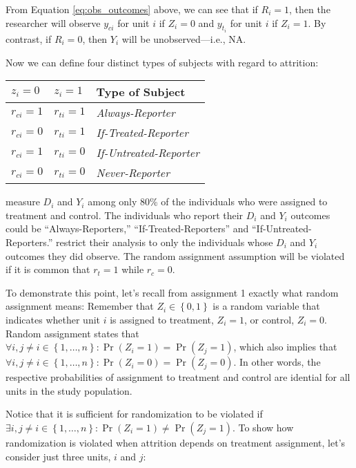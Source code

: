 \documentclass[11pt]{article}\usepackage[]{graphicx}\usepackage[]{color}
\theoremstyle{newstyle}
\begin{document}
From Equation \ref{eq:obs_outcomes} above, we can see that if $R_i = 1$, then the researcher will observe $y_{ci}$ for unit $i$ if $Z_i = 0$ and $y_{t_i}$ for unit $i$ if $Z_i = 1$. By contrast, if $R_i = 0$, then $Y_i$ will be unobserved---i.e., NA.

Now we can define four distinct types of subjects with regard to attrition:

\begin{table}[h]
\centering
    \begin{tabular}{lll}
    \toprule
    $z_i = 0$ & $z_i = 1$ & Type of Subject       \\
    \midrule
    $r_{ci} = 1$ & $r_{ti} = 1$ & \textit{Always-Reporter} \\
    $r_{ci} = 0$ & $r_{ti} = 1$ & \textit{If-Treated-Reporter} \\
    $r_{ci} = 1$ & $r_{ti} = 0$ & \textit{If-Untreated-Reporter} \\
    $r_{ci} = 0$ & $r_{ti} = 0$ & \textit{Never-Reporter} \\
    \bottomrule
    \end{tabular}
\end{table}

\citet{albertsonlawrence2009} measure $D_i$ and $Y_i$ among only 80\% of the individuals who were assigned to treatment and control. The individuals who report their $D_i$ and $Y_i$ outcomes could be ``Always-Reporters,'' ``If-Treated-Reporters'' and ``If-Untreated-Reporters.'' \citet{albertsonlawrence2009} restrict their analysis to only the individuals whose $D_i$ and $Y_i$ outcomes they did observe. The random assignment assumption will be violated if it is common that $r_t = 1$ while $r_c = 0$.

To demonstrate this point, let's recall from assignment 1 exactly what random assignment means: Remember that $Z_i \in \left\{0, 1\right\}$ is a random variable that indicates whether unit $i$ is assigned to treatment, $Z_i = 1$, or control, $Z_i = 0$. Random assignment states that $\forall i, j \neq i \in \left\{1, \dots , n\right\}: \Pr\left(Z_i = 1\right) = \Pr\left(Z_j = 1\right)$, which also implies that $\forall i, j \neq i \in \left\{1, \dots , n\right\}: \Pr\left(Z_i = 0\right) = \Pr\left(Z_j = 0\right)$. In other words, the respective probabilities of assignment to treatment and control are idential for all units in the study population.

Notice that it is sufficient for randomization to be violated if $\exists i, j \neq i \in \left\{1, \dots , n\right\}: \Pr\left(Z_i = 1\right) \neq \Pr\left(Z_j = 1\right)$. To show how randomization is violated when attrition depends on treatment assignment, let's consider just three units, $i$ and $j$:
\end{document}
